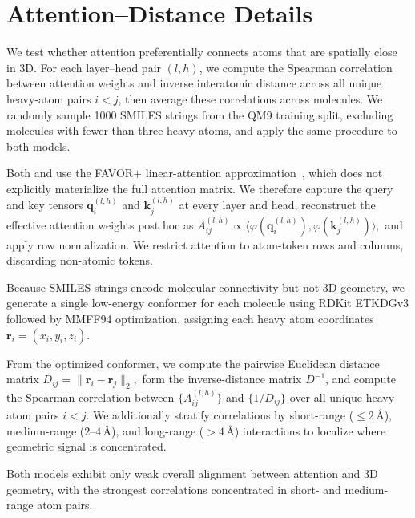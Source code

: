 \section{Attention--Distance Details}
\label{app:attention-appendix}

We test whether attention preferentially connects atoms that are spatially close in 3D. For each layer--head pair $(l,h)$, we compute the Spearman correlation between attention weights and inverse interatomic distance across all unique heavy-atom pairs $i<j$, then average these correlations across molecules. We randomly sample 1000 SMILES strings from the QM9 training split, excluding molecules with fewer than three heavy atoms, and apply the same procedure to both models.

Both \molm and \smi use the FAVOR$+$ linear-attention approximation~\citep{choromanski2021rethinking}, which does not explicitly materialize the full attention matrix. We therefore capture the query and key tensors $\mathbf{q}_i^{(l,h)}$ and $\mathbf{k}_j^{(l,h)}$ at every layer and head, reconstruct the effective attention weights post hoc as
$
A_{ij}^{(l,h)} \propto \langle \varphi(\mathbf{q}_i^{(l,h)}), \varphi(\mathbf{k}_j^{(l,h)}) \rangle,
$
and apply row normalization. We restrict attention to atom-token rows and columns, discarding non-atomic tokens.

Because SMILES strings encode molecular connectivity but not 3D geometry, we generate a single low-energy conformer for each molecule using RDKit ETKDGv3 followed by MMFF94 optimization, assigning each heavy atom coordinates $\mathbf{r}_i = (x_i,y_i,z_i)$.

From the optimized conformer, we compute the pairwise Euclidean distance matrix
$
D_{ij} = \|\mathbf{r}_i - \mathbf{r}_j\|_2,
$
form the inverse-distance matrix $D^{-1}$, and compute the Spearman correlation between $\{A_{ij}^{(l,h)}\}$ and $\{1/D_{ij}\}$ over all unique heavy-atom pairs $i<j$. We additionally stratify correlations by short-range ($\leq 2$\,\AA), medium-range ($2$--$4$\,\AA), and long-range ($>4$\,\AA) interactions to localize where geometric signal is concentrated.

Both models exhibit only weak overall alignment between attention and 3D geometry, with the strongest correlations concentrated in short- and medium-range atom pairs.
